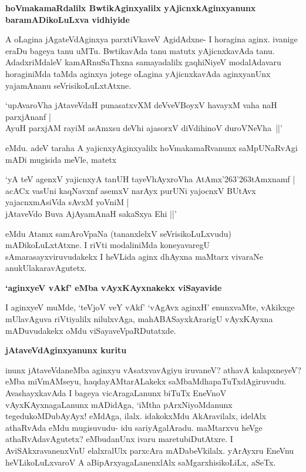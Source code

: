 {\bigskip
\noindent
{\large\bf hoVmakamaRdalilx BwtikAginxyalilx yAjicnxkAginxyanunx baramADikoLuLxva vidhiyide}}\label{page211}
\medskip

\noindent
A oLagina jAgateVdAginxya parxtiVkaveV AgidAdxne- I horagina aginx. ivanige eraDu bageya tanu uMTu. BwtikavAda tanu matutx yAjicnxkavAda tanu. AdadxriMdaleV kamARnuSaThxna samayadalilx gaqhiNiyeV modalAdavaru horaginiMda taMda aginxya jotege oLagina yAjicnxkavAda aginxyanUnx yajamAnanu seVrisikoLuLxtAtxne. 

\begin{shloka}
`upAvaroVha jAtaveVdaH punasatxvXM deVveVBoyxV havayxM vaha naH parxjAnanf |\\\label{211}
AyuH parxjAM rayiM asAmxsu deVhi ajasorxV diVdihinoV duroVNeVha~||'
\end{shloka}

\noindent
eMdu. adeV taraha A yajicnxyAginxyalilx hoVmakamaRvanunx saMpUNaRvAgi mADi mugi\-sida meVle, matetx

\begin{shloka}
`yA teV agenxV yajicnxyA tanUH tayeVhAyxroVha AtAmx\char'263\char'263tAmxnamf |\\\label{211}
acACx vasUni kaqNavxnf asemxV narAyx purUNi yajocnxV BUtAvx yajacnxmAsiVda sAvxM yoVniM |\\
jAtaveVdo Buva AjAyamAnaH sakaSxya Ehi ||'
\end{shloka}

\noindent
eMdu Atamx samAroVpaNa (tananxlelxV seVrisikoLuLxvudu) mADikoLuLxtAtxne. I riVti modali\-niMda koneyavaregU sAmarasayxviruvudakekx I heVLida aginx dhAyxna maMtarx vivaraNe anukUlakaravAgutetx.

{\bigskip
\noindent
{\large\bf `aginxyeV vAkf' eMba vAyxKAyxnakekx viSayavide}}\label{page211}
\medskip

\noindent
I aginxyeV muMde, `teVjoV veY vAkf'\label{212} `vAgAvx aginxH'\label{212} enunxvaMte, vAkikxge mUlavAguva riVti\-yalilx nilulxvAga, mahABASayxkArarigU vAyxKAyxna mADuvudakekx oMdu viSayaveVpaRDutatxde.

{\bigskip
\noindent
{\large\bf jAtaveVdAginxyanunx kuritu}}\label{page212}
\medskip

\noindent
inunx jAtaveVdaneMba aginxyu vAsatxvavAgiyu iruvaneV? athavA kalapxneyeV? eMba miVmAM\-seyu, haqdayAMtarALakekx saMbaMdhapaTuTxdAgiruvudu. Avashayxka\-vAda I bageya vicAragaLanunx biTuTx EneVnoV vAyxKAyxnagaLanunx mADidAga, `iMtha pArxNiyoMdanunx tegedukoMDubAyAyx! eMdAga, ilalx. idakokxMdu AkAravilalx, idelAlx athaRvAda eMdu mugisuvudu- idu sariyAgalAradu. maMtarxvu heVge athaRvAdavAgutetx? eMbudanUnx ivaru maretubiDutAtxre. I AviSAkxravanenxVnU elalxralUlx parxcAra mADabeVkilalx. yArAyxru EneVnu heVLikoLuLxvaroV A aBipArxyagaLanenxlAlx saMgarx\-hisi\-koLiLx, aSeTx.

